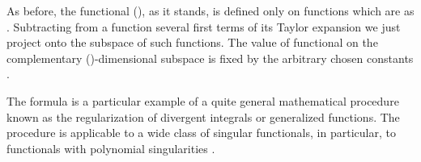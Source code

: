 \documentclass[a4paper,12pt]{article}
\begin{document}
As before, the functional (\myHighlight{$\ref{dn}$}\coordHE{}), as it stands, is defined only on
functions which are \coordHE{} as \coordHE{}. Subtracting from a
function \coordHE{} several first terms of its Taylor expansion we just project \coordHE{}
onto the subspace of such functions. The value of functional on the
complementary (\coordHE{})-dimensional subspace is fixed by the arbitrary chosen
constants \coordHE{}.

The formula \myHighlight{$(\ref{reg2})$}\coordHE{} is a particular example of a quite general
mathematical procedure known as the regularization of divergent integrals or
generalized functions. The procedure is applicable to a wide class of
singular functionals, in particular, to functionals with polynomial
singularities \cite{GSh}.
\end{document}
